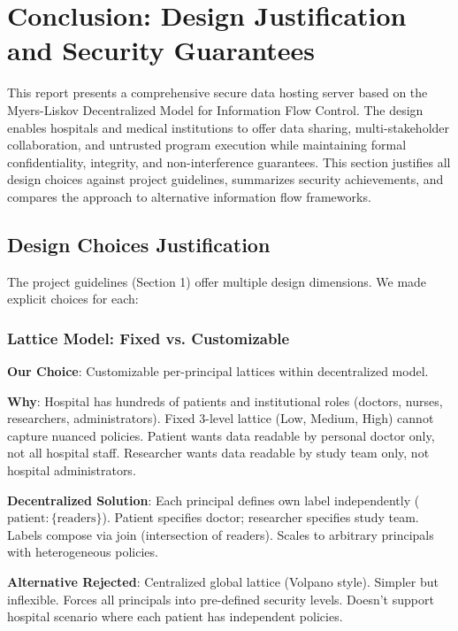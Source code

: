\section{Conclusion: Design Justification and Security Guarantees}

This report presents a comprehensive secure data hosting server based on the Myers-Liskov Decentralized Model for Information Flow Control. The design enables hospitals and medical institutions to offer data sharing, multi-stakeholder collaboration, and untrusted program execution while maintaining formal confidentiality, integrity, and non-interference guarantees. This section justifies all design choices against project guidelines, summarizes security achievements, and compares the approach to alternative information flow frameworks.

\subsection{Design Choices Justification}

The project guidelines (Section 1) offer multiple design dimensions. We made explicit choices for each:

\subsubsection{Lattice Model: Fixed vs. Customizable}

\textbf{Our Choice}: Customizable per-principal lattices within decentralized model.

\textbf{Why}: Hospital has hundreds of patients and institutional roles (doctors, nurses, researchers, administrators). Fixed 3-level lattice (Low, Medium, High) cannot capture nuanced policies. Patient wants data readable by personal doctor only, not all hospital staff. Researcher wants data readable by study team only, not hospital administrators.

\textbf{Decentralized Solution}: Each principal defines own label independently ($\text{patient}: \{\text{readers}\}$). Patient specifies doctor; researcher specifies study team. Labels compose via join (intersection of readers). Scales to arbitrary principals with heterogeneous policies.

\textbf{Alternative Rejected}: Centralized global lattice (Volpano style). Simpler but inflexible. Forces all principals into pre-defined security levels. Doesn't support hospital scenario where each patient has independent policies.

